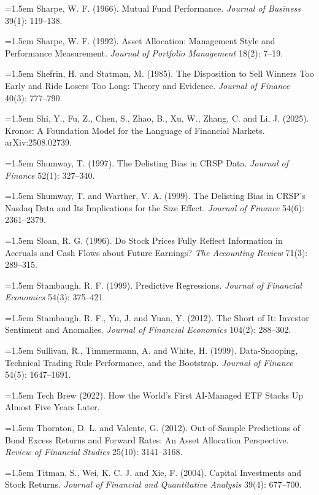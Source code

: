 \hangindent=1.5em Sharpe, W. F. (1966). Mutual Fund Performance. \emph{Journal of Business} 39(1): 119--138.

\hangindent=1.5em Sharpe, W. F. (1992). Asset Allocation: Management Style and Performance Measurement. \emph{Journal of Portfolio Management} 18(2): 7--19.

\hangindent=1.5em Shefrin, H. and Statman, M. (1985). The Disposition to Sell Winners Too Early and Ride Losers Too Long: Theory and Evidence. \emph{Journal of Finance} 40(3): 777--790.

\hangindent=1.5em Shi, Y., Fu, Z., Chen, S., Zhao, B., Xu, W., Zhang, C. and Li, J. (2025). Kronos: A Foundation Model for the Language of Financial Markets. arXiv:2508.02739.

\hangindent=1.5em Shumway, T. (1997). The Delisting Bias in CRSP Data. \emph{Journal of Finance} 52(1): 327--340.

\hangindent=1.5em Shumway, T. and Warther, V. A. (1999). The Delisting Bias in CRSP's Nasdaq Data and Its Implications for the Size Effect. \emph{Journal of Finance} 54(6): 2361--2379.

\hangindent=1.5em Sloan, R. G. (1996). Do Stock Prices Fully Reflect Information in Accruals and Cash Flows about Future Earnings? \emph{The Accounting Review} 71(3): 289--315.

\hangindent=1.5em Stambaugh, R. F. (1999). Predictive Regressions. \emph{Journal of Financial Economics} 54(3): 375--421.

\hangindent=1.5em Stambaugh, R. F., Yu, J. and Yuan, Y. (2012). The Short of It: Investor Sentiment and Anomalies. \emph{Journal of Financial Economics} 104(2): 288--302.

\hangindent=1.5em Sullivan, R., Timmermann, A. and White, H. (1999). Data-Snooping, Technical Trading Rule Performance, and the Bootstrap. \emph{Journal of Finance} 54(5): 1647--1691.

\hangindent=1.5em Tech Brew (2022). How the World's First AI-Managed ETF Stacks Up Almost Five Years Later.

\hangindent=1.5em Thornton, D. L. and Valente, G. (2012). Out-of-Sample Predictions of Bond Excess Returns and Forward Rates: An Asset Allocation Perspective. \emph{Review of Financial Studies} 25(10): 3141--3168.

\hangindent=1.5em Titman, S., Wei, K. C. J. and Xie, F. (2004). Capital Investments and Stock Returns. \emph{Journal of Financial and Quantitative Analysis} 39(4): 677--700.

